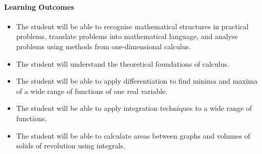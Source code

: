 \paragraph{Learning Outcomes}

\begin{itemize}
\item The student will be able to recognise mathematical structures in practical problems, translate
problems into mathematical language, and analyse problems using methods from one-dimensional calculus.
\item The student will understand the theoretical foundations of calculus.
\item The student will be able to apply differentiation to find minima and maxima of a wide range of
functions of one real variable.
\item The student will be able to apply integration techniques to a wide range of functions.
\item The student will be able to calculate areas between graphs and volumes of solids of revolution
using integrals.
\end{itemize}

